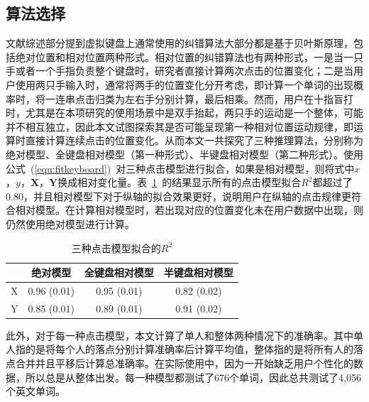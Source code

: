 \subsection{算法选择}
文献综述部分提到虚拟键盘上通常使用的纠错算法大部分都是基于贝叶斯原理，包括绝对位置和相对位置两种形式。相对位置的纠错算法也有两种形式，一是当一只手或者一个手指负责整个键盘时，研究者直接计算两次点击的位置变化；二是当用户使用两只手输入时，通常将两手的位置变化分开考虑，即计算一个单词的出现概率时，将一连串点击归类为左右手分别计算，最后相乘。然而，用户在十指盲打时，尤其是在本项研究的使用场景中是双手抬起，两只手的运动是一个整体，可能并不相互独立，因此本文试图探索其是否可能呈现第一种相对位置运动规律，即运算时直接计算连续点击的位置变化。从而本文一共探究了三种推理算法，分别称为绝对模型、全键盘相对模型（第一种形式）、半键盘相对模型（第二种形式）。使用公式~(\ref{equ:fitkeyboard})~对三种点击模型进行拟合，如果是相对模型，则将式中$x$，$y$，$\textbf{X}$，$\textbf{Y}$换成相对变化量。表~\ref{tab:modelr2}~的结果显示所有的点击模型拟合$R^2$都超过了0.80，并且相对模型下对于纵轴的拟合效果更好，说明用户在纵轴的点击规律更符合相对模型。在计算相对模型时，若出现对应的位置变化未在用户数据中出现，则仍然使用绝对模型进行计算。

\begin{table}[htb]
  \centering
  \begin{minipage}[t]{0.6\linewidth} %
  \caption[三种点击模型拟合的$R^{2}$]{三种点击模型拟合的$R^{2}$}
  \label{tab:modelr2}
    \centering
    \begin{tabularx}{\linewidth}{cccc}
      \toprule[1.5pt]
      & 绝对模型 & 全键盘相对模型 & 半键盘相对模型 \\\midrule[1pt]
      X & 0.96 (0.01) & 0.95 (0.01) & 0.82 (0.02) \\
      Y & 0.85 (0.01) & 0.89 (0.01) & 0.91 (0.02) \\
      \bottomrule[1.5pt]
    \end{tabularx}
  \end{minipage}
\end{table}

此外，对于每一种点击模型，本文计算了单人和整体两种情况下的准确率。其中单人指的是将每个人的落点分别计算准确率后计算平均值，整体指的是将所有人的落点合并并且平移后计算总准确率。在实际使用中，因为一开始缺乏用户个性化的数据，所以总是从整体出发。每一种模型都测试了676个单词，因此总共测试了4,056个英文单词。


